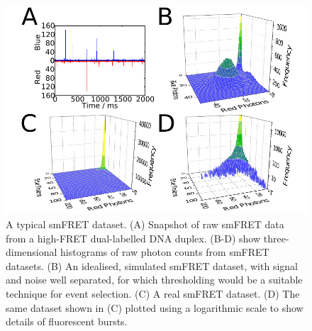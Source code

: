 
\begin{figure}
   \begin{center}
      \includegraphics*[width=6in]{inference/fig1_intro_graphs.pdf}
      \caption{A typical smFRET dataset. (A) Snapshot of raw smFRET data from a high-FRET dual-labelled DNA duplex. (B-D) show three-dimensional histograms of raw photon counts from smFRET datasets. (B) An idealised, simulated smFRET dataset, with signal and noise well separated, for which thresholding would be a suitable technique for event selection. (C) A real smFRET dataset. (D) The same dataset shown in (C) plotted using a logarithmic scale to show details of fluorescent bursts.}
      \label{fig:figure_diagram_scheme}
   \end{center}
\end{figure}


